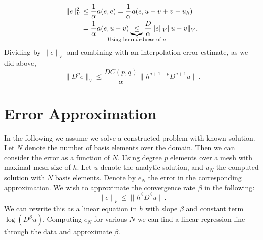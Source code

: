 \begin{align}
    \| e \|_V^2 &\leq \frac{1}{\alpha} a(e, e) = \frac{1}{\alpha}a(e, u- v + v - u_h) \\
                &= \frac{1}{\alpha} a(e, u - v)
                \underbrace{\leq}_{\mathclap{\text{Using boundedness of \(a
        \)}}} \frac{D}{\alpha}\| e \|_V \| u - v \|_V.
\end{align}
Dividing by \( \|e\|_V \) and combining with an interpolation error estimate,
as we did above, 
\begin{equation}
    \|D^pe \|_V \leq \frac{D C(p, q)}{\alpha} \|h^{q+1-p} D^{q+1}u \|.
\end{equation}

\section{Error Approximation}

In the following we assume we solve a constructed problem with known solution.
Let \( N \) denote the number of basis elements over the domain. Then we can
consider the error as a function of \( N \). Using degree \( p \) elements over
a mesh with maximal mesh size of \( h \). Let \( u \) denote the analytic
solution, and \( u_N \) the computed solution with \( N \) basis elements.
Denote by \( e_N \) the error in the corresponding approximation.  We wish to
approximate the convergence rate \( \beta \) in the following:
\begin{equation}
    \| e \|_V \leq \| h^\beta D^\beta u \|.
\end{equation}
We can rewrite this as a linear equation in \( h \) with slope \(\beta\) and
constant term \( \log(D^\beta u) \). Computing \( e_N \) for various \( N \) we
can find a linear regression line through the data and approximate \( \beta \).
